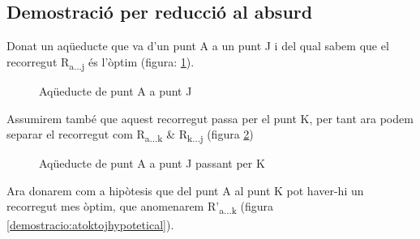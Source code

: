 \documentclass[12pt, letterpaper]{article}
\begin{document}
\newpage
\subsection{Demostració per reducció al absurd}
Donat un aqüeducte que va d'un punt A a un punt J i del qual sabem que el recorregut R\textsubscript{a...j} és l'òptim (figura: \ref{demostracio:atoj}).

\begin{figure}[htbp]
\begin{center}
\caption{Aqüeducte de punt A a punt J}
\label{demostracio:atoj}
\end{center}
\end{figure}

Assumirem també que aquest recorregut passa per el punt K, per tant ara podem separar el recorregut com R\textsubscript{a...k} \& R\textsubscript{k...j} (figura \ref{demostracio:atoktoj})

\begin{figure}[htbp]
\begin{center}
\caption{Aqüeducte de punt A a punt J passant per K}
\label{demostracio:atoktoj}
\end{center}
\end{figure}

Ara donarem com a hipòtesis que del punt A al punt K pot haver-hi un recorregut mes òptim, que anomenarem R'\textsubscript{a...k} (figura \ref{demostracio:atoktojhypotetical}).
\end{document}
